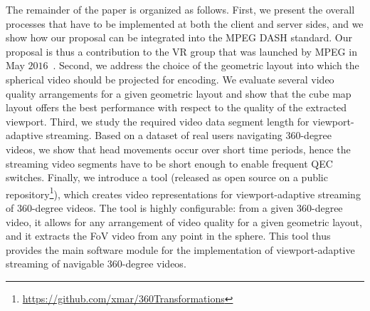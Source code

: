 The remainder of the paper is organized as follows. First, we present
the overall processes that have to be implemented at both the client
and server sides, and we show how our proposal can be integrated into
the \ac{MPEG} \ac{DASH} standard. Our proposal is thus a contribution
to the \ac{VR} group that was launched by \ac{MPEG} in May
$2016$~\cite{mpeg-vr}. Second, we address the choice of the geometric
layout into which the spherical video should be projected for
encoding. We evaluate several video quality arrangements for a given
geometric layout and show that the cube map layout offers the best
performance with respect to the quality of the extracted viewport.
Third, we study the required video data segment length for
viewport-adaptive streaming. Based on a dataset of real users
navigating 360-degree videos, we show that head movements occur over
short time periods, hence the streaming video segments have to be
short enough to enable frequent \ac{QEC} switches.  Finally, we introduce a tool (released as open source on
a public
repository\footnote{\url{https://github.com/xmar/360Transformations}}),
which creates video representations for viewport-adaptive streaming of
360-degree videos. The tool is highly configurable: from a given
360-degree video, it allows for any arrangement of video quality for a
given geometric layout, and it extracts the \ac{FoV} video from any
point in the sphere. This tool thus provides the main software module
for the implementation of viewport-adaptive streaming of navigable
360-degree videos.

